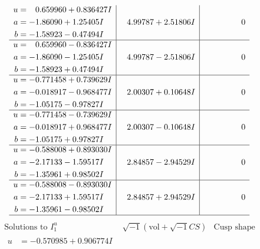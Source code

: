 \documentclass[1p]{elsarticle_modified}
\theoremstyle{definition}
\newcommand{\I}{\sqrt{-1}}
\begin{document}
$$\begin{array}{c|c|c}
\begin{aligned}
u &= \phantom{-}0.659960 + 0.836427 I \\
a &= -1.86090 + 1.25405 I \\
b &= -1.58923 - 0.47494 I\end{aligned}
 & \phantom{-}4.99787 + 2.51806 I & \phantom{-0.000000 } 0 \\ \hline\begin{aligned}
u &= \phantom{-}0.659960 - 0.836427 I \\
a &= -1.86090 - 1.25405 I \\
b &= -1.58923 + 0.47494 I\end{aligned}
 & \phantom{-}4.99787 - 2.51806 I & \phantom{-0.000000 } 0 \\ \hline\begin{aligned}
u &= -0.771458 + 0.739629 I \\
a &= -0.018917 - 0.968477 I \\
b &= -1.05175 - 0.97827 I\end{aligned}
 & \phantom{-}2.00307 + 0.10648 I & \phantom{-0.000000 } 0 \\ \hline\begin{aligned}
u &= -0.771458 - 0.739629 I \\
a &= -0.018917 + 0.968477 I \\
b &= -1.05175 + 0.97827 I\end{aligned}
 & \phantom{-}2.00307 - 0.10648 I & \phantom{-0.000000 } 0 \\ \hline\begin{aligned}
u &= -0.588008 + 0.893030 I \\
a &= -2.17133 - 1.59517 I \\
b &= -1.35961 + 0.98502 I\end{aligned}
 & \phantom{-}2.84857 - 2.94529 I & \phantom{-0.000000 } 0 \\ \hline\begin{aligned}
u &= -0.588008 - 0.893030 I \\
a &= -2.17133 + 1.59517 I \\
b &= -1.35961 - 0.98502 I\end{aligned}
 & \phantom{-}2.84857 + 2.94529 I & \phantom{-0.000000 } 0\\
 \hline 
 \end{array}$$\newpage$$\begin{array}{c|c|c}  
\text{Solutions to }I^u_{1}& \I (\text{vol} + \sqrt{-1}CS) & \text{Cusp shape}\\
 \hline 
\begin{aligned}
u &= -0.570985 + 0.906774 I \\

\end{aligned}
\end{array}$$
\end{document}
